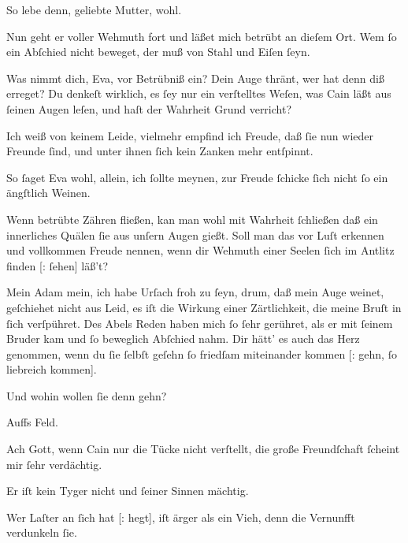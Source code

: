 \documentclass[tocstyle=ref-genre]{ees}
\begin{document}
{\begin{movement}{}
  \voice[Abel]
  So lebe denn, geliebte Mutter, wohl.

  \voice[Eva]
  Nun geht er voller Wehmuth fort
  und läßet mich betrübt an dieſem Ort.
  Wem ſo ein Abſchied nicht beweget,
  der muß von Stahl und Eiſen ſeyn.

  \voice[Adam]
  Was nimmt dich, Eva, vor Betrübniß ein?
  Dein Auge thränt, wer hat denn diß erreget?
  Du denkeſt wirklich,
  es ſey nur ein verſtelltes Weſen,
  was Cain läßt aus ſeinen Augen leſen,
  und haſt der Wahrheit Grund verricht?

  \voice[Eva]
  Ich weiß von keinem Leide,
  vielmehr empfind ich Freude,
  daß ſie nun wieder Freunde ſind,
  und unter ihnen ſich kein Zanken mehr entſpinnt.

  \voice[Adam]
  So ſaget Eva wohl, allein, ich ſollte meynen,
  zur Freude ſchicke ſich nicht ſo ein ängſtlich Weinen.
\end{movement}

\begin{movement}{}
  \voice[Adam]
  Wenn betrübte Zähren fließen,
  kan man wohl mit Wahrheit ſchließen
  daß ein innerliches Quälen
  ſie aus unſern Augen gießt.
  Soll man das vor Luſt erkennen
  und vollkommen Freude nennen,
  wenn dir Wehmuth einer Seelen
  ſich im Antlitz finden [: ſehen] läß’t?
\end{movement}

\begin{movement}{}
  \voice[Eva]
  Mein Adam mein,
  ich habe Urſach froh zu ſeyn,
  drum, daß mein Auge weinet,
  geſchiehet nicht aus Leid,
  es iſt die Wirkung einer Zärtlichkeit,
  die meine Bruſt in ſich verſpühret.
  Des Abels Reden haben mich ſo ſehr gerühret,
  als er mit ſeinem Bruder kam
  und ſo beweglich Abſchied nahm.
  Dir hätt’ es auch das Herz genommen,
  wenn du ſie ſelbſt geſehn
  ſo friedſam miteinander kommen [: gehn, ſo liebreich kommen].

  \voice[Adam]
  Und wohin wollen ſie denn gehn?

  \voice[Eva]
  Auffs Feld.

  \voice[Adam]
  Ach Gott, wenn Cain nur die Tücke nicht verſtellt,
  die große Freundſchaft ſcheint mir ſehr verdächtig.

  \voice[Eva]
  Er iſt kein Tyger nicht und ſeiner Sinnen mächtig.

  \voice[Adam]
  Wer Laſter an ſich hat [: hegt], iſt ärger als ein Vieh,
  denn die Vernunfft verdunkeln ſie.


\end{movement}}
\end{document}
